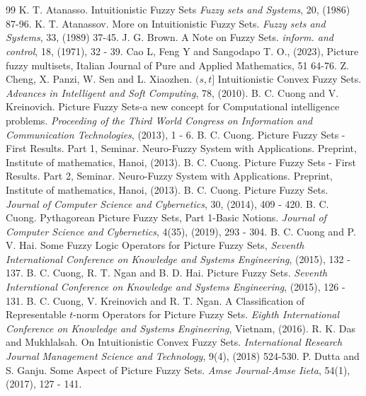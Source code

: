 \documentclass[12pt,letterpaper]{amsart}
\theoremstyle{plain}
\theoremstyle{definition}
\numberwithin{equation}{section}
\begin{document}
\ \\ \ \\
\begin{thebibliography}{99}
 K. T. Atanasso. Intuitionistic Fuzzy Sets \emph {Fuzzy sets and Systems}, 20, (1986) 87-96.
 K. T. Atanassov. More on Intuitionistic Fuzzy Sets. \emph {Fuzzy sets and Systems}, 33, (1989) 37-45.
 J. G. Brown. A Note on Fuzzy Sets. \emph{inform. and control}, 18, (1971), 32 - 39.
 Cao L, Feng Y and Sangodapo T. O., (2023), Picture fuzzy multisets, Italian Journal of Pure and Applied Mathematics, 51  64-76.
 Z. Cheng, X. Panzi, W. Sen and L. Xiaozhen. $(s, t]$ Intuitionistic Convex Fuzzy Sets. \emph{Advances in Intelligent and Soft Computing}, 78, (2010).
 B. C. Cuong and V. Kreinovich. Picture Fuzzy Sets-a new concept for Computational intelligence problems. \emph{Proceeding of the Third World Congress on Information and Communication Technologies}, (2013), 1 - 6. 
 B. C. Cuong. Picture Fuzzy Sets - First Results. Part 1, Seminar. Neuro-Fuzzy System with Applications. Preprint, Institute of mathematics, Hanoi, (2013).
 B. C. Cuong. Picture Fuzzy Sets - First Results. Part 2, Seminar. Neuro-Fuzzy System with Applications. Preprint, Institute of mathematics, Hanoi, (2013).
 B. C. Cuong. Picture Fuzzy Sets. \emph{Journal of Computer Science and Cybernetics}, 30, (2014), 409 - 420.
 B. C. Cuong. Pythagorean Picture Fuzzy Sets, Part 1-Basic Notions. \emph{Journal of Computer Science and Cybernetics}, 4(35), (2019), 293 - 304.
 B. C. Cuong and P. V. Hai. Some Fuzzy Logic Operators for Picture Fuzzy Sets, \emph{Seventh International Conference on Knowledge and Systems Engineering}, (2015), 132 - 137.
 B. C. Cuong, R. T. Ngan and B. D. Hai. Picture Fuzzy Sets. \emph{Seventh Interntional Conference on Knowledge and Systems Engineering}, (2015), 126 - 131.
 B. C. Cuong, V. Kreinovich and R. T. Ngan. A Classification of Representable $t$-norm Operators for Picture Fuzzy Sets. \emph{Eighth International Conference on Knowledge and Systems Engineering}, Vietnam, (2016).
 R. K. Das and Mukhlalsah. On Intuitionistic Convex Fuzzy Sets. \emph{International Research Journal Management Science and Technology}, 9(4), (2018) 524-530.
 P. Dutta and S. Ganju. Some Aspect of Picture Fuzzy Sets. \emph{Amse Journal-Amse Iieta}, 54(1), (2017), 127 - 141.

\end{thebibliography}
\end{document}
